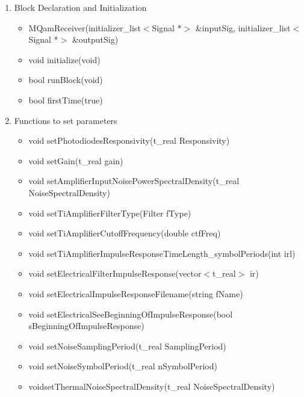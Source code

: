 \begin{enumerate}
\item Block Declaration and Initialization
             \begin{itemize}
                 \item MQamReceiver(initializer\_list$<$Signal *$>$ \&inputSig, initializer\_list$<$Signal *$>$ \&outputSig)
                 \item void initialize(void)
	             \item bool runBlock(void)
	             \item bool firstTime(true)
             \end{itemize}
\item Functions to set parameters
             \begin{itemize}
                \item void setPhotodiodesResponsivity(t\_real Responsivity)\\
                \item void setGain(t\_real gain)
                \item void setAmplifierInputNoisePowerSpectralDensity(t\_real NoiseSpectralDensity)
                \item void setTiAmplifierFilterType(Filter fType)
                \item void setTiAmplifierCutoffFrequency(double ctfFreq)
                \item void setTiAmplifierImpulseResponseTimeLength\_symbolPeriods(int irl)
                \item void setElectricalFilterImpulseResponse(vector$<$t\_real$>$ ir)
                \item void setElectricalImpulseResponseFilename(string fName)
                \item void setElectricalSeeBeginningOfImpulseResponse(bool sBeginningOfImpulseResponse) \\
                \item void setNoiseSamplingPeriod(t\_real SamplingPeriod)
                \item void setNoiseSymbolPeriod(t\_real nSymbolPeriod) \\
                \item voidsetThermalNoiseSpectralDensity(t\_real NoiseSpectralDensity)

\end{itemize}
\end{enumerate}
